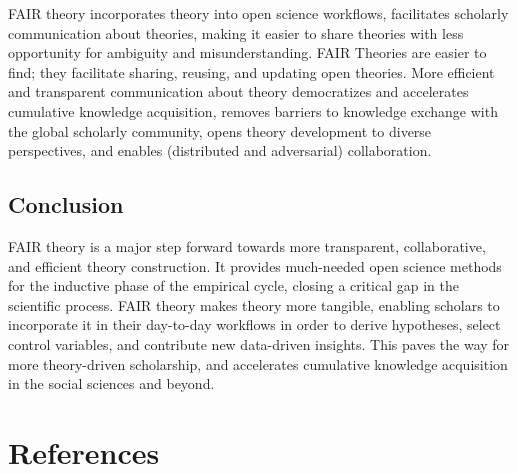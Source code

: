 \documentclass[
  man,floatsintext]{apa6}
\begin{document}
FAIR theory incorporates theory into open science workflows,
facilitates scholarly communication about theories,
making it easier to share theories with less opportunity for ambiguity and misunderstanding.
FAIR Theories are easier to find; they facilitate sharing, reusing, and updating open theories.
More efficient and transparent communication about theory democratizes and accelerates cumulative knowledge acquisition,
removes barriers to knowledge exchange with the global scholarly community,
opens theory development to diverse perspectives, and enables (distributed and adversarial) collaboration.

\subsection{Conclusion}\label{conclusion}

FAIR theory is a major step forward towards more transparent, collaborative, and efficient theory construction.
It provides much-needed open science methods for the inductive phase of the empirical cycle,
closing a critical gap in the scientific process.
FAIR theory makes theory more tangible, enabling scholars to incorporate it in their day-to-day workflows in order to derive hypotheses, select control variables, and contribute new data-driven insights.
This paves the way for more theory-driven scholarship,
and accelerates cumulative knowledge acquisition in the social sciences and beyond.

\newpage

\section{References}\label{references}
\end{document}
